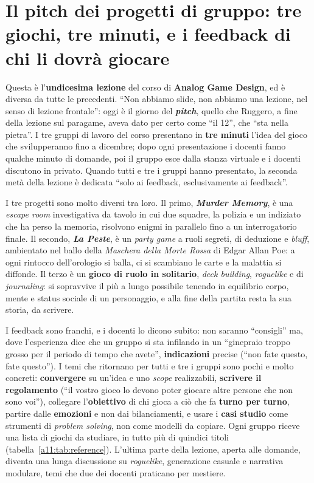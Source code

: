 \chapter[Il pitch dei progetti di gruppo]{Il pitch dei progetti di gruppo: tre
giochi, tre minuti, e i feedback di chi li dovrà giocare}
\label{a11:cap:pitch}

Questa è l'\textbf{undicesima lezione} del corso di \textbf{Analog Game Design}, ed è
diversa da tutte le precedenti. ``Non abbiamo slide, non abbiamo una lezione, nel senso
di lezione frontale'': oggi è il giorno del \textbf{\emph{pitch}}, quello che Ruggero, a
fine della lezione sul paragame, aveva dato per certo come ``il 12'', che ``sta nella
pietra''. I tre gruppi di lavoro del corso presentano in \textbf{tre minuti} l'idea del
gioco che svilupperanno fino a dicembre; dopo ogni presentazione i docenti fanno
qualche minuto di domande, poi il gruppo esce dalla stanza virtuale e i docenti
discutono in privato. Quando tutti e tre i gruppi hanno presentato, la seconda metà della
lezione è dedicata ``solo ai feedback, esclusivamente ai feedback''.

I tre progetti sono molto diversi tra loro. Il primo, \textbf{\emph{Murder Memory}}, è
una \emph{escape room} investigativa da tavolo in cui due squadre, la polizia e un
indiziato che ha perso la memoria, risolvono enigmi in parallelo fino a un
interrogatorio finale. Il secondo, \textbf{\emph{La Peste}}, è un \emph{party game} a
ruoli segreti, di deduzione e \emph{bluff}, ambientato nel ballo della \emph{Maschera
della Morte Rossa} di Edgar Allan Poe: a ogni rintocco dell'orologio si balla, ci si
scambiano le carte e la malattia si diffonde. Il terzo è un \textbf{gioco di ruolo in
solitario}, \emph{deck building}, \emph{roguelike} e di \emph{journaling}: si
sopravvive il più a lungo possibile tenendo in equilibrio corpo, mente e status
sociale di un personaggio, e alla fine della partita resta la sua storia, da scrivere.

I feedback sono franchi, e i docenti lo dicono subito: non saranno ``consigli'' ma, dove
l'esperienza dice che un gruppo si sta infilando in un ``ginepraio troppo grosso per il
periodo di tempo che avete'', \textbf{indicazioni} precise (``non fate questo, fate
questo''). I temi che ritornano per tutti e tre i gruppi sono pochi e molto concreti:
\textbf{convergere} su un'idea e uno \emph{scope} realizzabili, \textbf{scrivere il
regolamento} (``il vostro gioco lo devono poter giocare altre persone che non sono
voi''), collegare l'\textbf{obiettivo} di chi gioca a ciò che fa \textbf{turno per
turno}, partire dalle \textbf{emozioni} e non dai bilanciamenti, e usare i
\textbf{casi studio} come strumenti di \emph{problem solving}, non come modelli da
copiare. Ogni gruppo riceve una lista di giochi da studiare, in tutto più di quindici
titoli (tabella~\ref{a11:tab:reference}). L'ultima parte della lezione, aperta alle
domande, diventa una lunga discussione su \emph{roguelike}, generazione casuale e
narrativa modulare, temi che due dei docenti praticano per mestiere.

